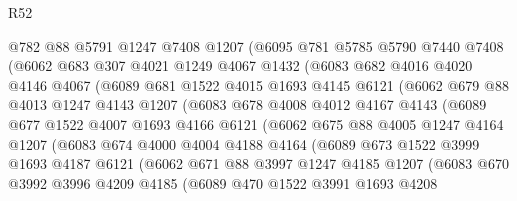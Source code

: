 \begin{lexlean}{R52}
\begin{coremodule}
          @782
          @88
          @5791
          @1247
          @7408
          @1207
          (@6095
            @781
            @5785
            @5790
            @7440
            @7408
            (@6062
              @683
              @307
              @4021
              @1249
              @4067
              @1432
              (@6083
                @682
                @4016
                @4020
                @4146
                @4067
                (@6089
                  @681
                  @1522
                  @4015
                  @1693
                  @4145
                  @6121
                  (@6062
                    @679
                    @88
                    @4013
                    @1247
                    @4143
                    @1207
                    (@6083
                      @678
                      @4008
                      @4012
                      @4167
                      @4143
                      (@6089
                        @677
                        @1522
                        @4007
                        @1693
                        @4166
                        @6121
                        (@6062
                          @675
                          @88
                          @4005
                          @1247
                          @4164
                          @1207
                          (@6083
                            @674
                            @4000
                            @4004
                            @4188
                            @4164
                            (@6089
                              @673
                              @1522
                              @3999
                              @1693
                              @4187
                              @6121
                              (@6062
                                @671
                                @88
                                @3997
                                @1247
                                @4185
                                @1207
                                (@6083
                                  @670
                                  @3992
                                  @3996
                                  @4209
                                  @4185
                                  (@6089
                                    @470
                                    @1522
                                    @3991
                                    @1693
                                    @4208

\end{coremodule}
\end{lexlean}
